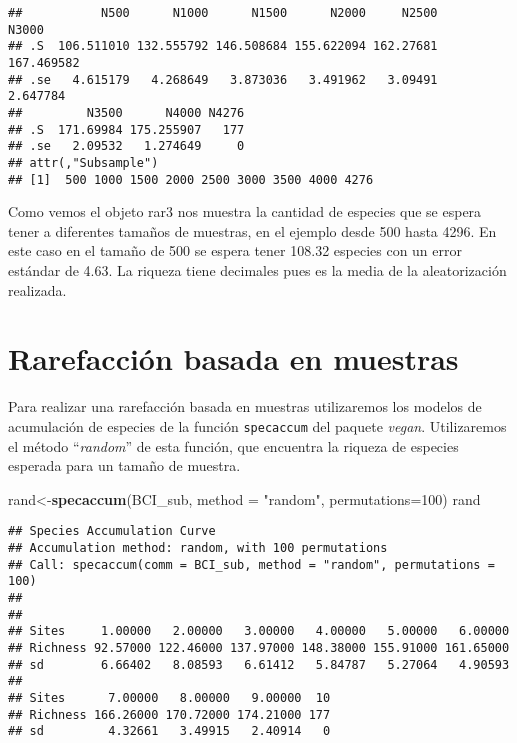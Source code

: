 \documentclass[]{book}
\newenvironment{Shaded}{\begin{snugshade}}{\end{snugshade}}
\newcommand{\KeywordTok}[1]{\textcolor[rgb]{0.13,0.29,0.53}{\textbf{{#1}}}}
\newcommand{\DataTypeTok}[1]{\textcolor[rgb]{0.13,0.29,0.53}{{#1}}}
\newcommand{\DecValTok}[1]{\textcolor[rgb]{0.00,0.00,0.81}{{#1}}}
\newcommand{\StringTok}[1]{\textcolor[rgb]{0.31,0.60,0.02}{{#1}}}
\newcommand{\NormalTok}[1]{{#1}}
\begin{document}
\begin{verbatim}
##           N500      N1000      N1500      N2000     N2500      N3000
## .S  106.511010 132.555792 146.508684 155.622094 162.27681 167.469582
## .se   4.615179   4.268649   3.873036   3.491962   3.09491   2.647784
##         N3500      N4000 N4276
## .S  171.69984 175.255907   177
## .se   2.09532   1.274649     0
## attr(,"Subsample")
## [1]  500 1000 1500 2000 2500 3000 3500 4000 4276
\end{verbatim}

Como vemos el objeto rar3 nos muestra la cantidad de especies que se
espera tener a diferentes tamaños de muestras, en el ejemplo desde 500
hasta 4296. En este caso en el tamaño de 500 se espera tener 108.32
especies con un error estándar de 4.63. La riqueza tiene decimales pues
es la media de la aleatorización realizada.

\section{Rarefacción basada en
muestras}\label{rarefaccion-basada-en-muestras}

Para realizar una rarefacción basada en muestras utilizaremos los
modelos de acumulación de especies de la función \texttt{specaccum} del
paquete \emph{vegan}. Utilizaremos el método ``\emph{random}'' de esta
función, que encuentra la riqueza de especies esperada para un tamaño de
muestra.

\begin{Shaded}
\begin{Highlighting}[]
\NormalTok{rand<-}\KeywordTok{specaccum}\NormalTok{(BCI_sub, }\DataTypeTok{method =} \StringTok{"random"}\NormalTok{, }\DataTypeTok{permutations=}\DecValTok{100}\NormalTok{)}
\NormalTok{rand}
\end{Highlighting}
\end{Shaded}

\begin{verbatim}
## Species Accumulation Curve
## Accumulation method: random, with 100 permutations
## Call: specaccum(comm = BCI_sub, method = "random", permutations = 100) 
## 
##                                                                    
## Sites     1.00000   2.00000   3.00000   4.00000   5.00000   6.00000
## Richness 92.57000 122.46000 137.97000 148.38000 155.91000 161.65000
## sd        6.66402   8.08593   6.61412   5.84787   5.27064   4.90593
##                                           
## Sites      7.00000   8.00000   9.00000  10
## Richness 166.26000 170.72000 174.21000 177
## sd         4.32661   3.49915   2.40914   0
\end{verbatim}
\end{document}
